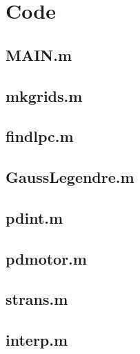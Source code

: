 \section{Code}
\subsection{MAIN.m}
\label{sec:app1}




\subsection{mkgrids.m}
\label{sec:app2}



\subsection{findlpc.m}
\label{sec:app3}


\subsection{GaussLegendre.m}
\label{sec:app4}


\subsection{pdint.m}
\label{sec:app5}


\subsection{pdmotor.m}
\label{sec:app6}


\subsection{strans.m}
\label{sec:app7}


\subsection{interp.m}
\label{sec:app8}


